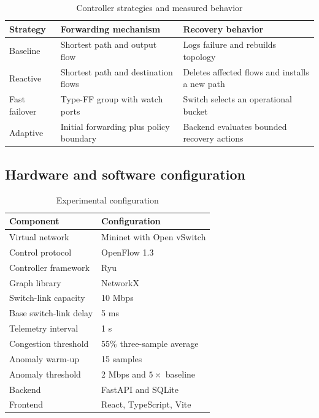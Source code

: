 \documentclass[conference]{IEEEtran}
\begin{document}
\begin{table}[t]
\centering
\caption{Controller strategies and measured behavior}
\label{tab:controllers}
\begin{tabular}{p{}p{}p{}}
\toprule
Strategy & Forwarding mechanism & Recovery behavior\\
\midrule
Baseline & Shortest path and output flow & Logs failure and rebuilds topology\\
Reactive & Shortest path and destination flows & Deletes affected flows and installs a new path\\
Fast failover & Type-FF group with watch ports & Switch selects an operational bucket\\
Adaptive & Initial forwarding plus policy boundary & Backend evaluates bounded recovery actions\\
\bottomrule
\end{tabular}
\end{table}

\subsection{Hardware and software configuration}

\begin{table}[t]
\centering
\caption{Experimental configuration}
\label{tab:configuration}
\begin{tabular}{ll}
\toprule
Component & Configuration\\
\midrule
Virtual network & Mininet with Open vSwitch\\
Control protocol & OpenFlow 1.3\\
Controller framework & Ryu\\
Graph library & NetworkX\\
Switch-link capacity & 10 Mbps\\
Base switch-link delay & 5 ms\\
Telemetry interval & 1 s\\
Congestion threshold & 55\% three-sample average\\
Anomaly warm-up & 15 samples\\
Anomaly threshold & 2 Mbps and $5\times$ baseline\\
Backend & FastAPI and SQLite\\
Frontend & React, TypeScript, Vite\\
\bottomrule
\end{tabular}
\end{table}
\end{document}
